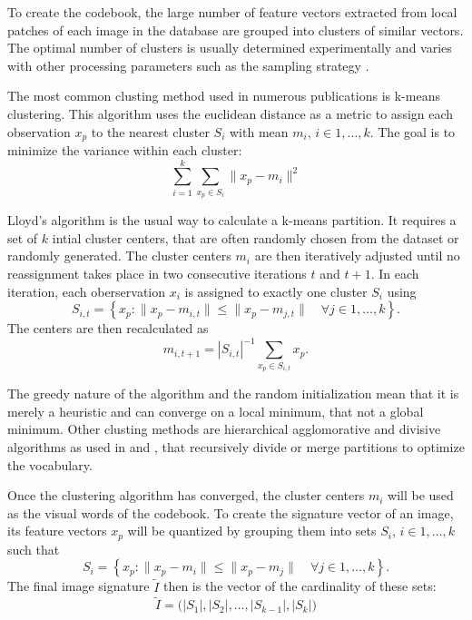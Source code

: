 To create the codebook, the large number of feature vectors extracted from
local patches of each image in the database are grouped into clusters of
similar vectors. The optimal number of clusters is usually determined
experimentally and varies with other processing parameters such as the sampling
strategy \autocite{nowak_sampling_2006} \autocite{yang_evaluating_2007}.


The most common clusting method used in numerous publications
\autocite{zhu_theory_2002} \autocite{sivic_video_2003}
\autocite{csurka_visual_2004} \autocite{fergus_learning_2005}
\autocite{winn_object_2005} is k-means clustering. This algorithm uses the
euclidean distance as a metric to assign each observation $x_p$ to the nearest
cluster $S_i$ with mean $m_i$, $i \in 1, \dots, k$. The goal is to minimize
the variance within each cluster:
\begin{equation*}
    \sum_{i=1}^k \sum_{x_p \in S_i} \| x_p - m_i \|^2
\end{equation*}

Lloyd's algorithm is the usual way to calculate a k-means partition. It
requires a set of $k$ intial cluster centers, that are often randomly chosen
from the dataset or randomly generated. The cluster centers $m_i$ are then
iteratively adjusted until no reassignment takes place in two consecutive
iterations $t$ and $t+1$. In each iteration, each oberservation $x_i$ is
assigned to exactly one cluster $S_i$ using
\begin{equation*}
    S_{i, t} = \left\{ x_p : \| x_p - m_{i, t} \| \leq \| x_p - m_{j, t} \| \quad \forall j \in 1, \dots, k \right\}.
\end{equation*}
The centers are then recalculated as
\begin{equation*}
    m_{i, t+1} = |S_{i, t}|^{-1} \sum_{x_p \in S_{i, t}} x_p.
\end{equation*}

The greedy nature of the algorithm and the random initialization mean that it
is merely a heuristic and can converge on a local minimum, that not a global
minimum.
Other clusting methods are hierarchical agglomorative and divisive algorithms as
used in \autocite{nister_scalable_2006} and \autocite {philbin_object_2007},
that recursively divide or merge partitions to optimize the vocabulary.

Once the clustering algorithm has converged, the cluster centers $m_i$ will be
used as the visual words of the codebook. To create the signature vector of an
image, its feature vectors $x_p$ will be quantized by grouping them into sets
$S_i$, $i \in 1, \dots, k$ such that
\begin{equation*}
    S_i = \left\{ x_p : \| x_p - m_{i} \| \leq \| x_p - m_{j} \| \quad \forall j \in 1, \dots, k \right\}.
\end{equation*}
The final image signature $\tilde{I}$ then is the vector of the cardinality of these sets:
\begin{equation*}
    \tilde{I} = \big( |S_1|, |S_2|, \dots, |S_{k-1}|, |S_{k}| \big)
\end{equation*}

